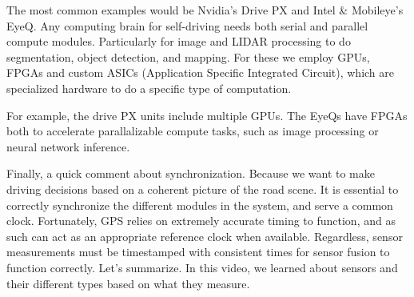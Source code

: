 The most common examples would be Nvidia's Drive PX and Intel \& Mobileye's EyeQ. Any computing brain for self-driving needs
both serial and parallel compute modules. Particularly for image and LIDAR processing to do segmentation, object detection, and mapping. 
For these we employ GPUs, FPGAs and custom ASICs (Application Specific Integrated Circuit), which are specialized hardware to
do a specific type of computation. 

For example, the drive PX units include multiple GPUs. The EyeQs have FPGAs both to
accelerate parallalizable compute tasks, such as image processing or
neural network inference. 

Finally, a quick comment about synchronization. Because we want to make driving
decisions based on a coherent picture of the road scene. It is essential to correctly synchronize
the different modules in the system, and serve a common clock. Fortunately, GPS relies on extremely
accurate timing to function, and as such can act as an appropriate
reference clock when available. Regardless, sensor measurements must be
timestamped with consistent times for sensor fusion to function correctly. Let's summarize. In this video,
we learned about sensors and their different types based
on what they measure. 


